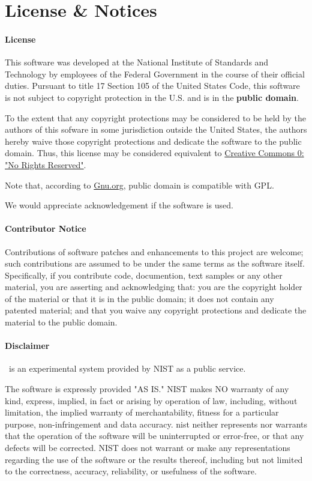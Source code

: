 \documentclass{article}
\begin{document}
\section{License \& Notices}\label{notices}

\paragraph{License}
  This software was developed at the National Institute of Standards and
Technology by employees of the Federal Government in the course of their
official duties. Pursuant to title 17 Section 105 of the United States
Code, this software is not subject to copyright protection in the U.S.
and is in the \textbf{public domain}.

To the extent that any copyright protections may be considered to be held
by the authors of this sofware in some jurisdiction outside the United
States, the authors hereby waive those copyright protections and dedicate
the software to the public domain. Thus, this license may be considered equivalent to
\href{http://creativecommons.org/about/cc0}{Creative Commons 0: "No Rights Reserved"}.

Note that, according to
\href{http://www.gnu.org/licences/license-list.html#PublicDomain}{Gnu.org},
public domain is compatible with GPL.

We would appreciate acknowledgement if the software is used.

\paragraph{Contributor Notice}
  Contributions of software patches and enhancements to this project
are welcome; such contributions are assumed to be under the same terms
as the software itself.  Specifically, if you contribute code, documention,
text samples or any other material, you are asserting and acknowledging that:
you are the copyright holder of the material or that it is in the public domain;
it does not contain any patented material; and that you waive any copyright
protections and dedicate the material to the public domain.

\paragraph{Disclaimer}
  \LaTeXML\ is an experimental system provided by NIST as a public service.

The software is expressly provided "AS IS." NIST makes NO warranty of
any kind, express, implied, in fact or arising by operation of law,
including, without limitation, the implied warranty of
merchantability, fitness for a particular purpose, non-infringement
and data accuracy. nist neither represents nor warrants that the
operation of the software will be uninterrupted or error-free, or that
any defects will be corrected. NIST does not warrant or make any
representations regarding the use of the software or the results
thereof, including but not limited to the correctness, accuracy,
reliability, or usefulness of the software.
\end{document}

